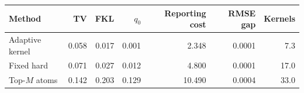 \begin{tabular}{lrrrrrr}
\toprule
Method & TV & FKL & $q_0$ & Reporting cost & RMSE gap & Kernels \\
\midrule
Adaptive kernel & 0.058 & 0.017 & 0.001 & 2.348 & 0.0001 & 7.3 \\
Fixed hard & 0.071 & 0.027 & 0.012 & 4.800 & 0.0001 & 17.0 \\
Top-$M$ atoms & 0.142 & 0.203 & 0.129 & 10.490 & 0.0004 & 33.0 \\
\bottomrule
\end{tabular}
